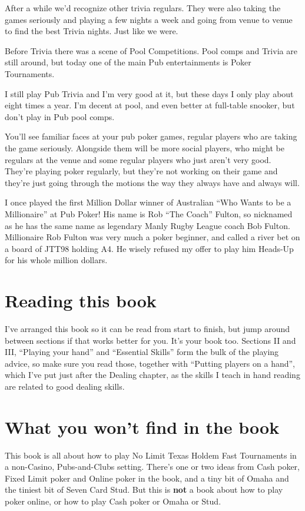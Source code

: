 After a while we'd recognize other trivia regulars. They were also
taking the games seriously and playing a few nights a week and going
from venue to venue to find the best Trivia nights. Just like we
were.

Before Trivia there was a scene of Pool Competitions. Pool
comps and Trivia are still around, but today one of the main Pub
entertainments is Poker Tournaments.

I still play Pub Trivia and I'm very good at it, but these days
I only play about eight times a year. I'm decent at pool, and even
better at full-table snooker, but don't play in Pub pool comps.

You'll see familiar faces at your pub poker games,
regular players who are taking the game seriously. Alongside them
will be more social players, who might be regulars at the venue
and some regular players who just aren't very good. They're playing
poker regularly, but they're not working on their game and they're
just going through the motions the way they always have and always
will.

I once played the first Million Dollar winner of Australian ``Who
Wants to be a Millionaire'' at Pub Poker! His name is Rob ``The
Coach'' Fulton, so nicknamed as he has the same name as legendary
Manly Rugby League coach Bob Fulton. Millionaire Rob Fulton was very
much a poker beginner, and called a river bet on a board of JTT98
holding A4. He wisely refused my offer to play him Heads-Up for his
whole million dollars.

\section{Reading this book}

I've arranged this book so it can be read from start to finish, but jump
around between sections if that works better for you. It's your book too.
Sections II and III, ``Playing your hand'' and ``Essential Skills'' form
the bulk of the playing advice, so make sure you read those, together
with ``Putting players on a hand'', which I've put just after the
Dealing chapter, as the skills I teach in hand reading are related
to good dealing skills.

\section{What you won't find in the book}

This book is all about how to play No Limit Texas Holdem Fast
Tournaments in a non-Casino, Pubs-and-Clubs setting. There's one or
two ideas from Cash poker, Fixed Limit poker and Online poker in the
book, and a tiny bit of Omaha and the tiniest bit of Seven Card Stud.
But this is \textbf{not} a book about how to play poker online, or how
to play Cash poker or Omaha or Stud.

